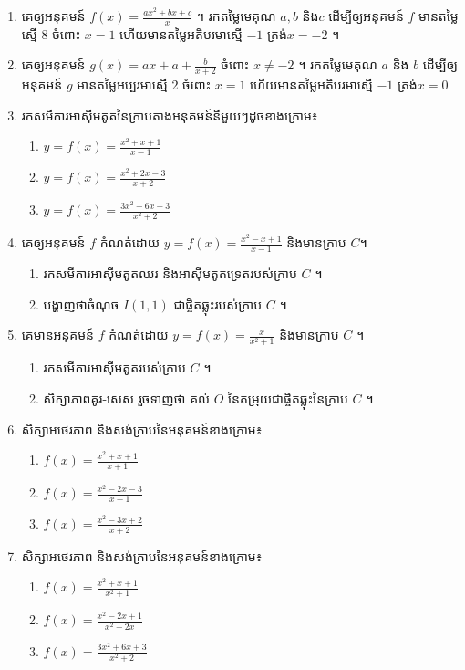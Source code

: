 \documentclass[12pt, a4paper]{article}
\begin{document}
\begin{enumerate}[m]
		\item គេឲ្យអនុគមន៍ $f(x)=\frac{ax^2+bx+c}{x}$ ។ រកតម្លៃមេគុណ $a, b$ និង$c$ ដើម្បីឲ្យអនុគមន៍ $f$ មានតម្លៃស្មើ $8$ ចំពោះ $x=1$ ហើយមានតម្លៃអតិបរមាស្មើ $-1$ ត្រង់$x=-2$ ។
		\item គេឲ្យអនុគមន៍ $g(x)=ax+a+\frac{b}{x+2}$ ចំពោះ $x\neq -2$ ។ រកតម្លៃមេគុណ $a$ និង $b$ ដើម្បីឲ្យអនុគមន៍ $g$ មានតម្លៃអប្បរមាស្មើ $2$ ចំពោះ $x=1$ ហើយមានតម្លៃអតិបរមាស្មើ $-1$ ត្រង់$x=0$ 
		\item រកសមីការអាស៊ីមតូតនៃក្រាបតាងអនុគមន៍នីមួយៗដូចខាងក្រោម៖
			\begin{enumerate}[k,3]
				\item $y=f(x)=\frac{x^2+x+1}{x-1}$
				\item $y=f(x)=\frac{x^2+2x-3}{x+2}$
				\item $y=f(x)=\frac{3x^2+6x+3}{x^2+2}$
			\end{enumerate}
		\item គេឲ្យអនុគមន៍ $f$ កំណត់ដោយ $y=f(x)=\frac{x^2-x+1}{x-1}$ និងមានក្រាប $C$។
			\begin{enumerate}[k]
				\item រកសមីការអាស៊ីមតូតឈរ និងអាស៊ីមតូតទ្រេតរបស់ក្រាប $C$ ។
				\item បង្ហាញថាចំណុច $I(1, 1)$ ជាផ្ចិតឆ្លុះរបស់ក្រាប $C$ ។
			\end{enumerate}
		\item គេមានអនុគមន៍ $f$ កំណត់ដោយ $y=f(x)=\frac{x}{x^2+1}$ និងមានក្រាប $C$ ។
		\begin{enumerate}[k]
			\item រកសមីការអាស៊ីមតូតរបស់ក្រាប $C$ ។
			\item សិក្សាភាពគូរ-សេស រួចទាញថា គល់ $O$ នៃតម្រុយជាផ្ចិតឆ្លុះនៃក្រាប $C$ ។
		\end{enumerate}
	\item សិក្សាអថេរភាព និងសង់ក្រាបនៃអនុគមន៍ខាងក្រោម៖ 
		\begin{enumerate}[k,3]
			\item $f(x)=\frac{x^2+x+1}{x+1}$
			\item $f(x)=\frac{x^2-2x-3}{x-1}$
			\item $f(x)=\frac{x^2-3x+2}{x+2}$
		\end{enumerate}
	\item សិក្សាអថេរភាព និងសង់ក្រាបនៃអនុគមន៍ខាងក្រោម៖ 
		\begin{enumerate}[k,3]
			\item $f(x)=\frac{x^2+x+1}{x^2+1}$
			\item $f(x)=\frac{x^2-2x+1}{x^2-2x}$
			\item $f(x)=\frac{3x^2+6x+3}{x^2+2}$

\end{enumerate}
\end{enumerate}
\end{document}
